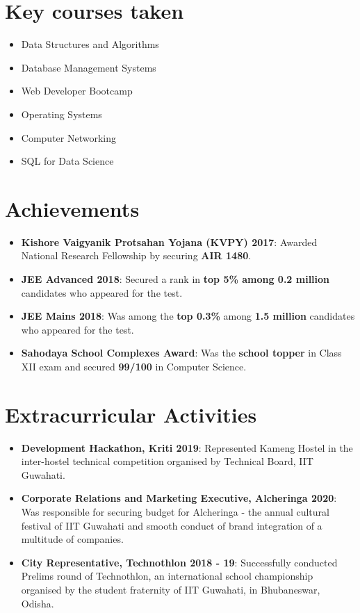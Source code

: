 \documentclass[a4paper,10pt]{report}
\newcommand{\resumeItem}[2]{
  \item\small{
    \textbf{#1}{: #2 \vspace{-2pt}}
  }
}
\newcommand{\resumeSubItem}[2]{\resumeItem{#1}{#2}\vspace{-4pt}}
\newcommand{\resumeSubHeadingListStart}{\begin{itemize}[leftmargin=*]}
\newcommand{\resumeSubHeadingListEnd}{\end{itemize}}
\begin{document}
 \section{Key courses taken}
\vspace{-2pt}
 \begin{multicols}{2}
 \begin{itemize}[leftmargin = *,itemsep=-3pt]
 
\item Data Structures and Algorithms
\item Database Management Systems
\item Web Developer Bootcamp
%
\item Operating Systems
\item Computer Networking
\item SQL for Data Science

\end{itemize}
\end{multicols}
 

\section{Achievements}
\resumeSubHeadingListStart
\resumeSubItem{Kishore Vaigyanik Protsahan Yojana (KVPY) 2017}{Awarded National Research Fellowship by securing \textbf{AIR 1480}.}
\vspace{1.5pt}
\resumeSubItem{JEE Advanced 2018}{Secured a rank in \textbf{top 5\% among 0.2 million} candidates who appeared for the test.}
\vspace{1.5pt}
\resumeSubItem{JEE Mains 2018}{Was among the \textbf{top 0.3\%} among \textbf{1.5 million} candidates who appeared for the test.}
\vspace{1.5pt}
\resumeSubItem{Sahodaya School Complexes Award}{Was the \textbf{school topper} in Class XII exam and secured \textbf{99/100} in Computer Science.}
\resumeSubHeadingListEnd
 
\vspace{-2pt}
\section{Extracurricular Activities}
\resumeSubHeadingListStart
\resumeSubItem{Development Hackathon, Kriti 2019}{Represented Kameng Hostel in the inter-hostel technical competition organised by Technical Board, IIT Guwahati.}
\vspace{2pt}
\resumeSubItem{Corporate Relations and Marketing Executive, Alcheringa 2020}{Was responsible for securing budget for Alcheringa - the annual cultural festival of IIT Guwahati and smooth conduct of brand integration of a multitude of companies.}
\vspace{2pt}
\resumeSubItem{City Representative, Technothlon 2018 - 19}{Successfully conducted Prelims round of Technothlon, an international school championship organised by the student fraternity of IIT Guwahati, in Bhubaneswar, Odisha.}
\resumeSubHeadingListEnd
 
 
\end{document}
